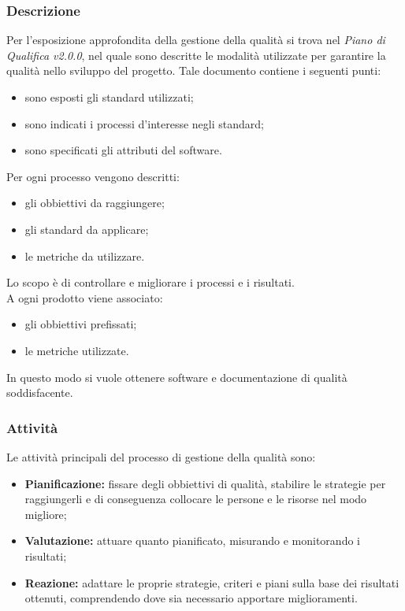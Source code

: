 \subsubsection{Descrizione}
Per l'esposizione approfondita della gestione della qualità si trova nel \emph{Piano di Qualifica v2.0.0}, nel quale sono descritte le modalità utilizzate per garantire la qualità nello sviluppo del progetto. Tale documento contiene i seguenti punti:
\begin{itemize}
    \item sono esposti gli standard utilizzati;
    \item sono indicati i processi d'interesse negli standard;
    \item sono specificati gli attributi del software.
\end{itemize}
Per ogni processo vengono descritti:
\begin{itemize}
    \item gli obbiettivi da raggiungere;
    \item gli standard da applicare;
    \item le metriche da utilizzare.
\end{itemize}
Lo scopo è di controllare e migliorare i processi e i risultati. \\
A ogni prodotto viene associato:
\begin{itemize}
    \item gli obbiettivi prefissati;
    \item le metriche utilizzate.
\end{itemize}
In questo modo si vuole ottenere software e documentazione di qualità soddisfacente.
\subsubsection{Attività}
Le attività principali del processo di gestione della qualità sono:
\begin{itemize}
    \item \textbf{Pianificazione:} fissare degli obbiettivi di qualità, stabilire le strategie per raggiungerli e di conseguenza collocare le persone e le risorse nel modo migliore;
    \item \textbf{Valutazione:} attuare quanto pianificato, misurando e monitorando i risultati;
    \item \textbf{Reazione:} adattare le proprie strategie, criteri e piani sulla base dei risultati ottenuti, comprendendo dove sia necessario apportare miglioramenti.
\end{itemize}
